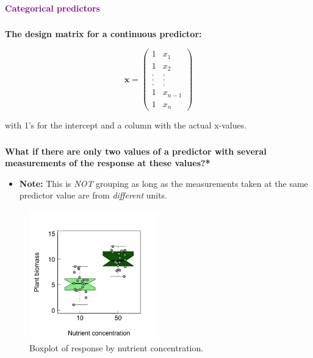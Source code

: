 \documentclass{beamer}
\begin{document}
\begin{frame}
  \frametitle{}
  \begin{center}
    \huge\textbf{\textcolor{purple}{Categorical predictors}}
  \end{center}
\end{frame}

\begin{frame}
  \frametitle{}
  \textbf{The design matrix for a continuous predictor:}

  \begin{equation*}
  \mathbf{x} = \left( \begin{array}{cc} 1 & x_{1} \\ 1 & x_{2} \\ . & . \\ . & . \\ . & . \\ 1 & x_{n-1} \\ 1 & x_n \end{array}\right)
  \end{equation*}

  with 1's for the intercept and a column with the actual x-values.
\end{frame}

\begin{frame}
  \frametitle{}
  \textbf{What if there are only two values of a predictor with several measurements of the response at these values?*}

  \begin{itemize}
    \item \textbf{Note:} This is \textit{NOT} grouping as long as the measurements taken at the same predictor value are from \textit{different} units.
  \end{itemize}
  
  \begin{figure}[h]
    \centering
    \includegraphics[width=0.5\textwidth]{lectures/day_3_LM_refresh_II/figures/unnamed-chunk-8-1.png} 
    \caption{Boxplot of response by nutrient concentration.}
  \end{figure}
\end{frame}
\end{document}

